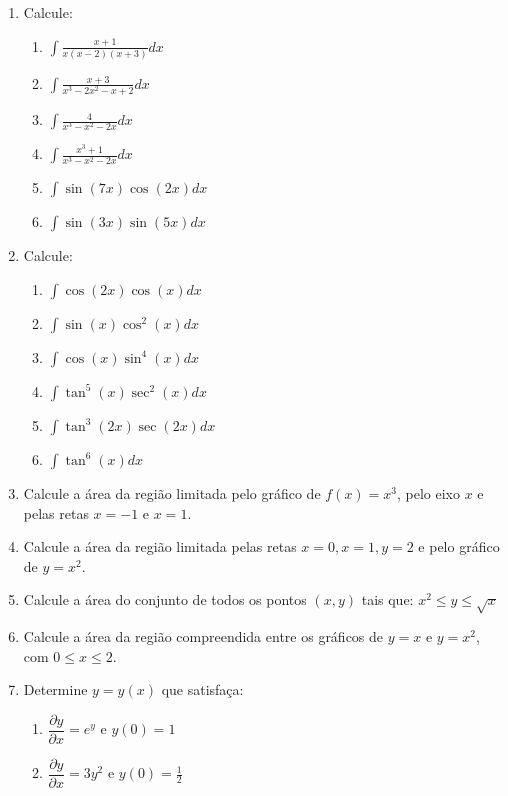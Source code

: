 \documentclass[oneside,a4paper,12pt]{article}
\begin{document}
\begin{enumerate}
	\item Calcule:
	\begin{multicols}{2}
		\begin{enumerate}
			\item $\displaystyle \int \frac{x+1}{x(x-2)(x+3)}dx$
			\item $\displaystyle \int \frac{x+3}{x^3 -2x^2 -x +2}dx$
			\item $\displaystyle \int \frac{4}{x^3 - x^2 -2x}dx$
			\item $\displaystyle \int \frac{x^3 +1}{x^3 -x^2 -2x}dx$
			\item $\displaystyle \int \sin(7x)\cos(2x)dx$
			\item $\displaystyle \int \sin(3x)\sin(5x)dx$
		\end{enumerate}
	\end{multicols}

	\item Calcule:
	\begin{multicols}{2}
		\begin{enumerate}
			\item $\displaystyle \int \cos(2x)\cos(x)dx$
			\item $\displaystyle \int \sin(x)\cos^2(x)dx$
			\item $\displaystyle \int \cos(x)\sin^4(x)dx$
			\item $\displaystyle \int \tan^5(x)\sec^2(x)dx$
			\item $\displaystyle \int \tan^3(2x)\sec(2x)dx$
			\item $\displaystyle \int \tan^6(x)dx$  
		\end{enumerate}
	\end{multicols}
	
	\item Calcule a área da região limitada pelo gráfico de $f(x) = x^3$, pelo eixo $x$ e pelas retas $x=-1$ e $x=1$.
	
	\item Calcule a área da região limitada pelas retas $x=0,x=1,y=2$ e pelo gráfico de $y=x^2$.
	
	\item Calcule a área do conjunto de todos os pontos $(x,y)$ tais que: $x^2 \leq y \leq \sqrt{x}$
	
	\item Calcule a área da região compreendida entre os gráficos de $y=x$ e $y=x^2$, com $0 \leq x \leq 2$.
	
	\item Determine $y = y(x)$ que satisfaça:
	\begin{multicols}{2}
		\begin{enumerate}
			\item $\dfrac{\partial y}{\partial x}= e^y$ e $y(0)=1$
			\item $\dfrac{\partial y}{\partial x}= 3y^2$ e $y(0) = \frac{1}{2}$
		\end{enumerate}
	\end{multicols}
	
\end{enumerate}


	
\end{document}
